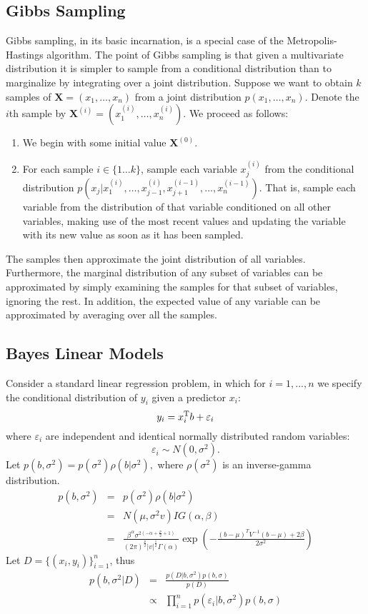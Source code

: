 \documentclass[11pt]{article}
\begin{document}
\subsection{Gibbs Sampling}
Gibbs sampling, in its basic incarnation, is a special case of the Metropolis-Hastings algorithm. The point of Gibbs sampling is that given a multivariate distribution it is simpler to sample from a conditional distribution than to marginalize by integrating over a joint distribution. Suppose we want to obtain $k$ samples of $\mathbf{X} = (x_1, \dots, x_n)$ from a joint distribution $\left.p(x_1, \dots, x_n)\right..$ Denote the $i$th sample by $\mathbf{X}^{(i)} = (x_1^{(i)}, \dots, x_n^{(i)})$. We proceed as follows:
\begin{enumerate}
\item    We begin with some initial value $\mathbf{X}^{(0)}$.
\item    For each sample $i \in \{1 \dots k\}$, sample each variable $x_j^{(i)}$ from the conditional distribution $p(x_j|x_1^{(i)},\dots,x_{j-1}^{(i)},x_{j+1}^{(i-1)},\dots,x_n^{(i-1)})$. That is, sample each variable from the distribution of that variable conditioned on all other variables, making use of the most recent values and updating the variable with its new value as soon as it has been sampled.
\end{enumerate}
The samples then approximate the joint distribution of all variables. Furthermore, the marginal distribution of any subset of variables can be approximated by simply examining the samples for that subset of variables, ignoring the rest. In addition, the expected value of any variable can be approximated by averaging over all the samples.
\subsection{Bayes Linear Models}
Consider a standard linear regression problem, in which for $i=1,...,n$ we specify the conditional distribution of $y_i$ given a predictor $x_i$:
$$
    y_{i} = x_{i}^{\rm T} b + \varepsilon_i
$$
where  $\varepsilon_i$ are independent and identical normally distributed random variables:
$$
    \varepsilon_i \sim N(0, \sigma^2). 
$$
Let $p(b,\sigma^{2}) = p(\sigma^{2})\rho(b|\sigma^{2}), $ 
where $\rho(\sigma^{2})$ is an inverse-gamma distribution.
\begin{eqnarray*}
p(b,\sigma^2) &=& p(\sigma^{2})\rho(b|\sigma^{2}) \\
&=& N(\mu, \sigma^2v) IG(\alpha,\beta) \\
&=& \frac{\beta^\alpha\sigma^{2(-\alpha+\frac{p}{2}+1)}}{(2\pi)^{\frac{p}{2}}|v|^{\frac{1}{2}}\Gamma(\alpha)}\exp{\left(-\frac{(b-\mu)^TV^{-1}(b-\mu)+2\beta}{2\sigma^2}\right)}
\end{eqnarray*}
Let $D=\{(x_i,y_i)\}_{i=1}^{n}$, thus
\begin{eqnarray*}
p(b,\sigma^2|D) &=& \frac{p(D|b,\sigma^2)p(b,\sigma)}{p(D)} \\
&\propto& \prod_{i=1}^{n}p(\varepsilon_i|b,\sigma^2)p(b,\sigma) \\
\end{eqnarray*}
\end{document}
